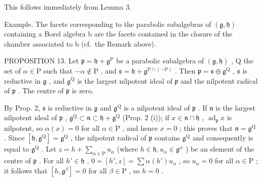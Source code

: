 This follows immediately from Lemma 3.

Example. The facets corresponding to the parabolic subalgebras of \((\mathfrak{g}, \mathfrak{h})\) containing a Borel algebra b are the facets contained in the closure of the chamber associated to b (cf.~the Remark above).

PROPOSITION 13. Let \(\mathfrak{p} = \mathfrak{h} + \mathfrak{g}^{\mathrm{P}}\) be a parabolic subalgebra of \((\mathfrak{g},\mathfrak{h})\) , Q the set of \(\alpha \in \mathrm{P}\) such that \(-\alpha \notin \mathrm{P}\) , and \(\mathfrak{s} = \mathfrak{h} + \mathfrak{g}^{\mathrm{P}\cap (-\mathrm{P})}\) . Then \(\mathfrak{p} = \mathfrak{s} \oplus \mathfrak{g}^{\mathrm{Q}}\) , \(\mathfrak{s}\) is reductive in \(\mathfrak{g}\) , and \(\mathfrak{g}^{\mathrm{Q}}\) is the largest nilpotent ideal of \(\mathfrak{p}\) and the nilpotent radical of \(\mathfrak{p}\) . The centre of \(\mathfrak{p}\) is zero.

By Prop. 2, \(\mathfrak{s}\) is reductive in \(\mathfrak{g}\) and \(\mathfrak{g}^{\mathrm{Q}}\) is a nilpotent ideal of \(\mathfrak{p}\) . If \(\mathfrak{n}\) is the largest nilpotent ideal of \(\mathfrak{p}\) , \(\mathfrak{g}^{\mathrm{Q}} \subset \mathfrak{n} \subset \mathfrak{h} + \mathfrak{g}^{\mathrm{Q}}\) (Prop. 2 (i)); if \(x \in \mathfrak{n} \cap \mathfrak{h}\) , \(\operatorname{ad}_{\mathfrak{p}} x\) is nilpotent, so \(\alpha(x) = 0\) for all \(\alpha \in \mathrm{P}\) , and hence \(x = 0\) ; this proves that \(\mathfrak{n} = \mathfrak{g}^{\mathrm{Q}}\) . Since \([\mathfrak{h}, \mathfrak{g}^{\mathrm{Q}}] = \mathfrak{g}^{\mathrm{Q}}\) , the nilpotent radical of \(\mathfrak{p}\) contains \(\mathfrak{g}^{\mathrm{Q}}\) and consequently is equal to \(\mathfrak{g}^{\mathrm{Q}}\) . Let \(z = h + \sum_{\alpha \in \mathrm{P}} u_{\alpha}\) (where \(h \in \mathfrak{h}, u_{\alpha} \in \mathfrak{g}^{\alpha}\) ) be an element of the centre of \(\mathfrak{p}\) . For all \(h' \in \mathfrak{h}\) , \(0 = [h', z] = \sum \alpha(h')u_{\alpha}\) , so \(u_{\alpha} = 0\) for all \(\alpha \in \mathrm{P}\) ; it follows that \([h, \mathfrak{g}^{\beta}] = 0\) for all \(\beta \in \mathrm{P}\) , so \(h = 0\) .

